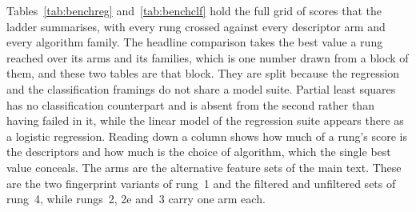 \documentclass[letterpaper]{article}
\newcommand{\framingA}{framing~A}
\newcommand{\framingB}{framing~B}
\begin{document}
\begin{table}[htbp]
  \centering
  \footnotesize
  \caption{\textbf{Rung~2 and rung~2e descriptors.} The 33 geometric quantities
    measured on the docked pose and the heavy-atom covariate carried beside them, with
    the 29 of the 34 that the receptor ensemble carries over to rung~2e.}
  \label{tab:sirung2}
  
\end{table}

\begin{table}[htbp]
  \centering
  \footnotesize
  \caption{\textbf{Rung~3 descriptors.} The 22 MM/GBSA quantities, computed on the
    rung~2 pose after minimisation of the ligand hydrogens. Differences within a matched
    pair are what the models see, because the absolute values are not interpretable.}
  \label{tab:sirung3}
  
\end{table}

\begin{table}[htbp]
  \centering
  \footnotesize
  \caption{\textbf{Rung~4 descriptors and the reliability filter.} The 32 dynamic
    descriptors, the ratio of between-ligand to between-replicate spread for each, and
    the verdict that ratio produced.}
  \label{tab:sirung4}
  
\end{table}

\clearpage

Tables~\ref{tab:benchreg} and~\ref{tab:benchclf} hold the full grid of scores that the
ladder summarises, with every rung crossed against every descriptor arm and every
algorithm family. The headline comparison takes the best value a rung reached over its
arms and its families, which is one number drawn from a block of them, and these two
tables are that block. They are split because the regression and the classification framings
do not share a model suite. Partial least squares has no classification counterpart
and is absent from the second rather than having failed in it, while the linear model of
the regression suite appears there as a logistic regression. Reading down a column shows how
much of a rung's score is the descriptors and how much is the choice of algorithm,
which the single best value conceals. The arms are the alternative feature sets of the
main text. These are the two fingerprint variants of rung~1 and the filtered and
unfiltered sets of rung~4, while rungs~2, 2e and~3 carry one arm each.

\begin{table}[tb]
  \centering
  \caption{\textbf{Every regression family on \framingA{} and \framingB{}.} Each rung
    with every descriptor arm it was scored with, so a quoted best value can be
    located in its grid.}
  \label{tab:benchreg}
  
\end{table}
\end{document}
